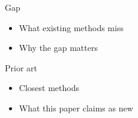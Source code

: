 
\begin{frame}{Gap}
  \begin{itemize}
    \item What existing methods miss
    \item Why the gap matters
  \end{itemize}
\end{frame}

\begin{frame}{Prior art}
  \begin{itemize}
    \item Closest methods
    \item What this paper claims as new
  \end{itemize}
\end{frame}
